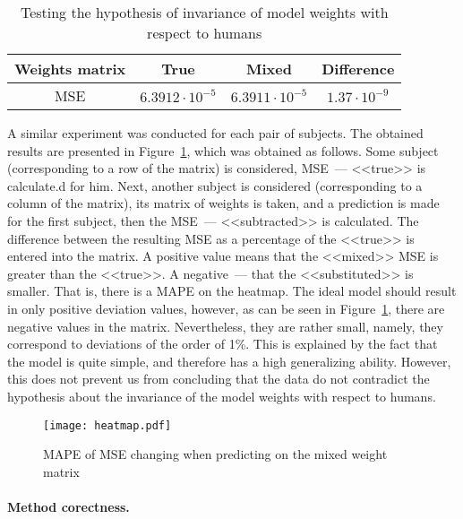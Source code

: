\documentclass{article}
\begin{document}
\begin{table}[h!]
	\centering
	\caption{Testing the hypothesis of invariance of model weights with respect to humans}
	\begin{tabular}{|c|c|c|c|}
		\hline
		Weights matrix & True             & Mixed  & Difference        \\ \hline \hline
		MSE           & $6.3912 \cdot 10^{-5}$ & $6.3911 \cdot 10^{-5}$ & $1.37 \cdot 10^{-9}$ \\ \hline
	\end{tabular}
	\label{table:inv}
\end{table}

A similar experiment was conducted for each pair of subjects.
The obtained results are presented in Figure~\ref{fig:heatmap},
which was obtained as follows.
Some subject (corresponding to a row of the matrix) is considered, 
MSE~--- <<true>> is calculate.d for him.
Next, another subject is considered (corresponding to a column of the matrix),
its matrix of weights is taken, and a prediction is made for the first 
subject, then the MSE~--- <<subtracted>> is calculated. 
The difference between the resulting MSE as a percentage of the <<true>> is entered into the matrix.
A positive value means that the <<mixed>> MSE is greater than the <<true>>.
A negative~--- that the <<substituted>> is smaller.
That is, there is a MAPE on the heatmap.
The ideal model should result in only positive deviation values, however,
as can be seen in Figure~\ref{fig:heatmap}, there are negative values in the matrix.
Nevertheless, they are rather small, namely, they correspond to deviations of the order of 1\%.
This is explained by the fact that the model is quite simple, and therefore has a
high generalizing ability.
However, this does not prevent us from concluding that the data do not contradict the hypothesis 
about the invariance of the model weights with respect to humans.

\begin{figure}[h!]
	\centering
	\texttt{[image: heatmap.pdf]}
	\caption{MAPE of MSE changing when predicting on the mixed weight matrix}
	\label{fig:heatmap}
\end{figure}

\paragraph*{Method corectness.}
\end{document}

